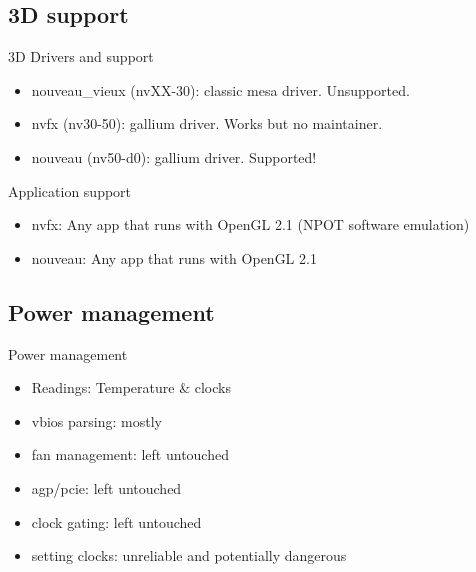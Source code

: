 \documentclass[11pt,english,compress]{beamer}
\begin{document}
	\subsection{3D support}
		\begin{frame}
			\begin{block}{3D Drivers and support}
				\begin{itemize}
					\item nouveau\_vieux (nvXX-30): classic mesa driver. Unsupported.
					\item nvfx (nv30-50): gallium driver. Works but no maintainer.
					\item nouveau (nv50-d0): gallium driver. Supported! 
				\end{itemize}
			\end{block}

	
			\begin{block}{Application support}
				\begin{itemize}
					\item nvfx: Any app that runs with OpenGL 2.1 (NPOT software emulation)
					\item nouveau: Any app that runs with OpenGL 2.1
				\end{itemize}
			\end{block}
		\end{frame}

	\subsection{Power management}
		\begin{frame}
			\begin{block}{Power management}
 				\begin{itemize}
					\item Readings: Temperature \& clocks
					\item vbios parsing: mostly
					\item fan management: left untouched
					\item agp/pcie: left untouched
					\item clock gating: left untouched
					\item setting clocks: unreliable and potentially dangerous
				\end{itemize}
			\end{block}
		\end{frame}
\end{document}
